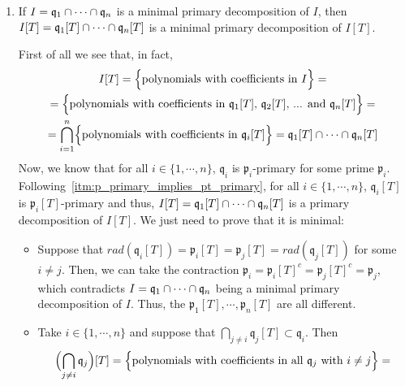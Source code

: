 \begin{problem}
\begin{enumerate}[label=(\theproblem.\arabic*),ref=\theproblem.\arabic*]
        \item If $I = \mathfrak{q}_1 \cap \cdots \cap \mathfrak{q}_n$ is a minimal primary decomposition of $I$, then $I[T] = \mathfrak{q}_1[T] \cap \cdots \cap \mathfrak{q}_n[T]$ is a minimal primary decomposition of $I[T]$.
        \begin{sol}
            First of all we see that, in fact,
            \begin{gather*}
                I[T] = \Bigl\{ \text{polynomials with coefficients in } I \Bigr\} =\\
                = \Bigl\{ \text{polynomials with coefficients in } \mathfrak{q}_1[T] \text{, } \mathfrak{q}_2[T] \text{, ... and } \mathfrak{q}_n[T] \Bigr\} =\\
                = \bigcap_{i=1}^n \Bigl\{ \text{polynomials with coefficients in } \mathfrak{q}_i[T] \Bigr\} = \mathfrak{q}_1[T] \cap \cdots \cap \mathfrak{q}_n[T]\\
            \end{gather*}
            Now, we know that for all $i \in \{ 1, \cdots, n \}$, $\mathfrak{q}_i$ is $\mathfrak{p}_i$-primary for some prime $\mathfrak{p}_i$.
            Following~\ref{itm:p_primary_implies_pt_primary}, for all $i \in \{ 1, \cdots, n \}$, $\mathfrak{q}_i[T]$ is $\mathfrak{p}_i[T]$-primary and thus, $I[T] = \mathfrak{q}_1[T] \cap \cdots \cap \mathfrak{q}_n[T]$ is a primary decomposition of $I[T]$.
            We just need to prove that it is minimal:
            \begin{itemize}
                \item
                Suppose that $rad(\mathfrak{q}_i[T]) = \mathfrak{p}_i[T] = \mathfrak{p}_j[T] = rad(\mathfrak{q}_j[T])$ for some $i \neq j$.
                Then, we can take the contraction $\mathfrak{p}_i = \mathfrak{p}_i[T]^c = \mathfrak{p}_j[T]^c = \mathfrak{p}_j$, which contradicts $I = \mathfrak{q}_1 \cap \cdots \cap \mathfrak{q}_n$ being a minimal primary decomposition of $I$.
                Thus, the $\mathfrak{p}_1[T], \cdots, \mathfrak{p}_n[T]$ are all different.
                \item
                Take $i \in \{ 1, \cdots, n \}$ and suppose that $\bigcap_{j \neq i} \mathfrak{q}_j[T] \subset \mathfrak{q}_i$.
                Then
                \begin{gather*}
                    \Bigl( \bigcap_{j \neq i} \mathfrak{q}_j \Bigr)[T] = \Bigl\{ \text{polynomials with coefficients in all } \mathfrak{q}_j \text{ with } i \neq j \Bigr\} =\\

\end{gather*}
\end{itemize}
\end{sol}
\end{enumerate}
\end{problem}
